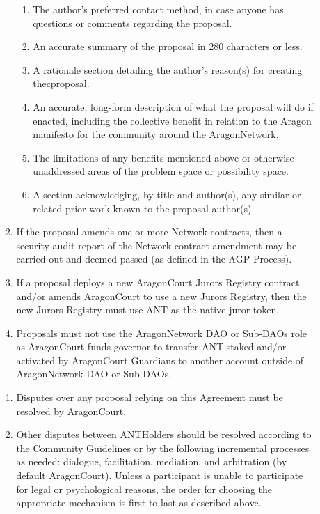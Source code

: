 \begin{enumerate}
\begin{enumerate}
\begin{enumerate}
\begin{enumerate}
				\item The author’s preferred contact method, in case anyone has questions or comments regarding the proposal.
				\item An accurate summary of the proposal in 280 characters or less.
				\item A rationale section detailing the author’s reason(s) for creating thecproposal.
				\item An accurate, long-form description of what the proposal will do if enacted, including the collective benefit in relation to the Aragon manifesto for the community around the \gls{AragonNetwork}.
				\item The limitations of any benefits mentioned above or otherwise unaddressed areas of the problem space or possibility space.
				\item A section acknowledging, by title and author(s), any similar or related prior work known to the proposal author(s).
			\end{enumerate}
		
			\item If the proposal amends one or more Network contracts, then a security audit report of the Network contract amendment may be carried out and deemed passed (as defined in the \ac{AGP} Process).
			\item If a proposal deploys a new \gls{AragonCourt} Jurors Registry contract and/or
			amends \gls{AragonCourt} to use a new Jurors Registry, then the new Jurors Registry must use \ac{ANT} as the native juror token.
			\item Proposals must not use the \gls{AragonNetwork} \ac{DAO} or Sub-\acp{DAO} role as \gls{AragonCourt} funds governor to transfer \ac{ANT} staked and/or activated by \gls{AragonCourt} \glspl{Guardian} to another account outside of \gls{AragonNetwork} \ac{DAO} or Sub-\acp{DAO}.
		\end{enumerate}

		\begin{enumerate}
			\item Disputes over any proposal relying on this Agreement must be resolved by \gls{AragonCourt}.
			\item Other disputes between \glspl{ANTHolder} should be resolved according to the Community Guidelines or by the following incremental processes as needed: dialogue, facilitation, mediation, and arbitration (by default \gls{AragonCourt}).
			Unless a participant is unable to participate for legal or psychological reasons, the order for choosing the appropriate mechanism is first to last as described above.
		\end{enumerate}


\end{enumerate}
\end{enumerate}
